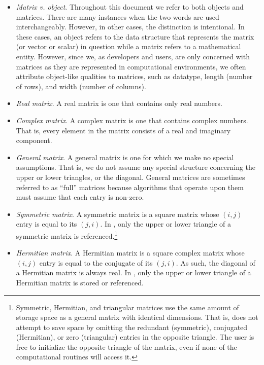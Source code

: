 \begin{itemize}

\item
{\em Matrix v. object}.
Throughout this document we refer to both objects and matrices.
There are many instances when the two words are used interchangeably.
However, in other cases, the distinction is intentional.
In these cases,
an object refers to the data structure that represents the matrix (or vector
or scalar) in question while a matrix refers to a mathematical entity.
However, since we, as \libflame developers and users, are only concerned
with matrices as they are represented in computational environments, we
often attribute object-like qualities to matrices, such as
datatype, length (number of rows), and width (number of columns).

\item
{\em Real matrix}.
A real matrix is one that contains only real numbers.

\item
{\em Complex matrix}.
A complex matrix is one that contains complex numbers.
That is, every element in the matrix consists of a real and imaginary
component.

\item
{\em General matrix}.
A general matrix is one for which we make no special assumptions.
That is, we do not assume any special structure concerning the upper
or lower triangles, or the diagonal.
General matrices are sometimes referred to as ``full'' matrices because
algorithms that operate upon them must assume that each entry is non-zero.

\item
{\em Symmetric matrix}.
A symmetric matrix is a square matrix whose $ (i,j) $ entry is equal to its
$ (j,i) $.
In \libflamens, only the upper or lower triangle of a symmetric matrix 
is referenced.\footnote{
Symmetric, Hermitian, and triangular matrices use the same amount of
storage space as a general matrix with identical dimensions.
That is, \libflame does not attempt to save space by omitting the redundant
(symmetric), conjugated (Hermitian), or zero (triangular) entries in the
opposite triangle.
The user is free to initialize the opposite triangle of the matrix,
even if none of the computational routines will access it.
}

\item
{\em Hermitian matrix}.
A Hermitian matrix is a square complex matrix whose $ (i,j) $ entry is equal to
the conjugate of its $ (j,i) $.
As such, the diagonal of a Hermitian matrix is always real.
In \libflamens, only the upper or lower triangle of a Hermitian matrix is stored
or referenced.\footnotemark[\value{footnote}]


\end{itemize}
